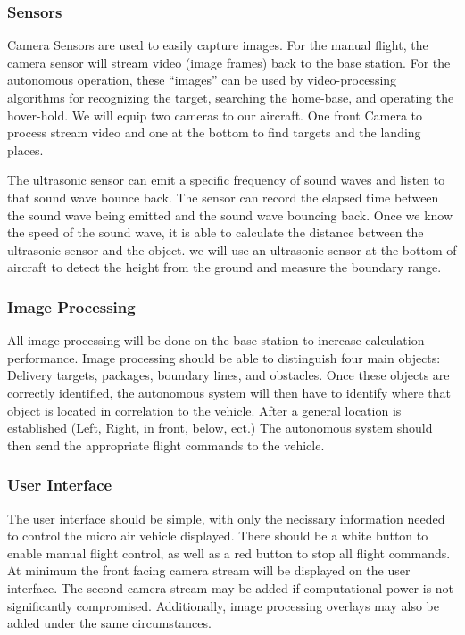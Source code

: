 \documentclass[onecolumn, draftclsnofoot,10pt, compsoc]{IEEEtran}
\begin{document}
\subsubsection{Sensors}%

Camera Sensors are used to easily capture images. For the manual flight, the camera sensor will stream video (image frames) back to the base station. For the autonomous operation, these “images” can be used by video-processing algorithms for recognizing the target, searching the home-base, and operating the hover-hold. We will equip two cameras to our aircraft. One front Camera to process stream video and one at the bottom to find targets and the landing places.


The ultrasonic sensor can emit a specific frequency of sound waves and listen to that sound wave bounce back. The sensor can record the elapsed time between the sound wave being emitted and the sound wave bouncing back. \cite{r11} Once we know the speed of the sound wave, it is able to calculate the distance between the ultrasonic sensor and the object. we will use an ultrasonic sensor at the bottom of aircraft to detect the height from the ground and measure the boundary range.


\subsubsection{Image Processing}

All image processing will be done on the base station to increase calculation performance. Image processing should be able to distinguish four main objects: Delivery targets, packages, boundary lines, and obstacles. Once these objects are correctly identified, the autonomous system will then have to identify where that object is located in correlation to the vehicle. After a general location is established (Left, Right, in front, below, ect.) The autonomous system should then send the appropriate flight commands to the vehicle. 

\subsubsection{User Interface}

The user interface should be simple, with only the necissary information needed to control the micro air vehicle displayed. There should be a white button to enable manual flight control, as well as a red button to stop all flight commands. At minimum the front facing camera stream will be displayed on the user interface. The second camera stream may be added if computational power is not significantly compromised. Additionally, image processing overlays may also be added under the same circumstances. 
\end{document}
